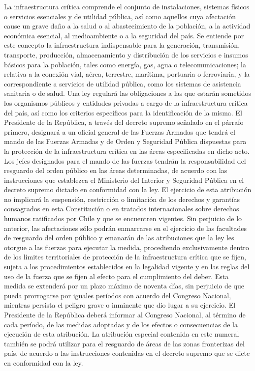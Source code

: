     La infraestructura crítica comprende el conjunto de instalaciones, sistemas físicos o servicios esenciales y de utilidad pública, así como aquellos cuya afectación cause un grave daño a la salud o al abastecimiento de la población, a la actividad económica esencial, al medioambiente o a la seguridad del país. Se entiende por este concepto la infraestructura indispensable para la generación, transmisión, transporte, producción, almacenamiento y distribución de los servicios e insumos básicos para la población, tales como energía, gas, agua o telecomunicaciones; la relativa a la conexión vial, aérea, terrestre, marítima, portuaria o ferroviaria, y la correspondiente a servicios de utilidad pública, como los sistemas de asistencia sanitaria o de salud. Una ley regulará las obligaciones a las que estarán sometidos los organismos públicos y entidades privadas a cargo de la infraestructura crítica del país, así como los criterios específicos para la identificación de la misma.
    El Presidente de la República, a través del decreto supremo señalado en el párrafo primero, designará a un oficial general de las Fuerzas Armadas que tendrá el mando de las Fuerzas Armadas y de Orden y Seguridad Pública dispuestas para la protección de la infraestructura crítica en las áreas especificadas en dicho acto. Los jefes designados para el mando de las fuerzas tendrán la responsabilidad del resguardo del orden público en las áreas determinadas, de acuerdo con las instrucciones que establezca el Ministerio del Interior y Seguridad Pública en el decreto supremo dictado en conformidad con la ley.
    El ejercicio de esta atribución no implicará la suspensión, restricción o limitación de los derechos y garantías consagrados en esta Constitución o en tratados internacionales sobre derechos humanos ratificados por Chile y que se encuentren vigentes. Sin perjuicio de lo anterior, las afectaciones sólo podrán enmarcarse en el ejercicio de las facultades de resguardo del orden público y emanarán de las atribuciones que la ley les otorgue a las fuerzas para ejecutar la medida, procediendo exclusivamente dentro de los límites territoriales de protección de la infraestructura crítica que se fijen, sujeta a los procedimientos establecidos en la legalidad vigente y en las reglas del uso de la fuerza que se fijen al efecto para el cumplimiento del deber.
    Esta medida se extenderá por un plazo máximo de noventa días, sin perjuicio de que pueda prorrogarse por iguales períodos con acuerdo del Congreso Nacional, mientras persista el peligro grave o inminente que dio lugar a su ejercicio. El Presidente de la República deberá informar al Congreso Nacional, al término de cada período, de las medidas adoptadas y de los efectos o consecuencias de la ejecución de esta atribución.
    La atribución especial contenida en este numeral también se podrá utilizar para el resguardo de áreas de las zonas fronterizas del país, de acuerdo a las instrucciones contenidas en el decreto supremo que se dicte en conformidad con la ley.

